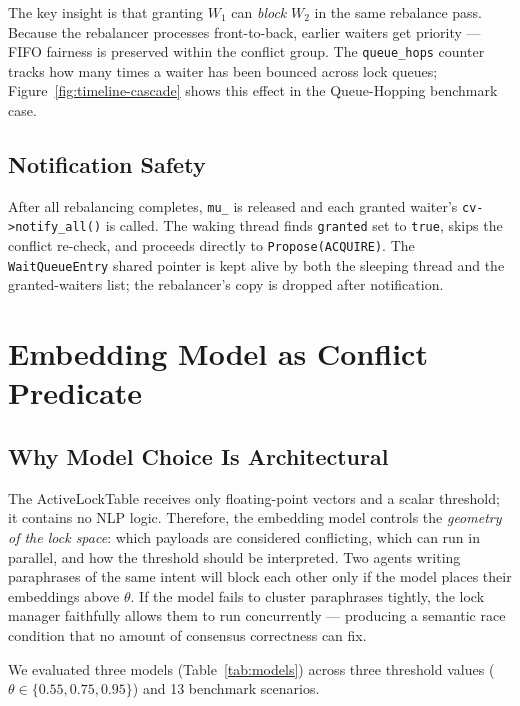\documentclass[sigconf]{acmart}
\begin{document}
\noindent The key insight is that granting $W_1$ can \emph{block} $W_2$ in the same
rebalance pass. Because the rebalancer processes front-to-back, earlier waiters get
priority — FIFO fairness is preserved within the conflict group. The
\texttt{queue\_hops} counter tracks how many times a waiter has been bounced across
lock queues; Figure~\ref{fig:timeline-cascade} shows this effect in the
Queue-Hopping benchmark case.

\subsection{Notification Safety}

After all rebalancing completes, \texttt{mu\_} is released and each granted waiter's
\texttt{cv->notify\_all()} is called. The waking thread finds \texttt{granted} set to \texttt{true},
skips the conflict re-check, and proceeds directly to \texttt{Propose(ACQUIRE)}. The
\texttt{Wait\-Queue\-Entry} shared pointer is kept alive by both the sleeping thread and
the granted-waiters list; the rebalancer's copy is dropped after notification.

\section{Embedding Model as Conflict Predicate}
\label{sec:embedding}

\subsection{Why Model Choice Is Architectural}

The ActiveLockTable receives only floating-point vectors and a scalar threshold; it
contains no NLP logic. Therefore, the embedding model controls the \emph{geometry of the
lock space}: which payloads are considered conflicting, which can run in parallel, and
how the threshold should be interpreted. Two agents writing paraphrases of the same
intent will block each other only if the model places their embeddings above $\theta$. If
the model fails to cluster paraphrases tightly, the lock manager faithfully allows them
to run concurrently — producing a semantic race condition that no amount of consensus
correctness can fix.

We evaluated three models (Table~\ref{tab:models}) across three threshold values
($\theta \in \{0.55, 0.75, 0.95\}$) and 13 benchmark scenarios.
\end{document}
